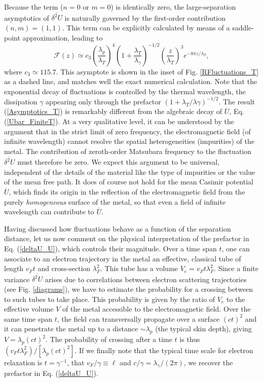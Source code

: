 \documentclass[doublecol]{epl2}
\begin{document}
Because the term ($n=0$ or $m=0$) is identically zero, the large-separation asymptotics of $\overline{\delta^2 U}$ is naturally governed by the first-order contribution $(n,m)=(1,1)$. This term can be explicitly calculated by means of a saddle-point approximation, leading to
\begin{equation}
\mathcal{F}(z)\simeq
c_3
\left(\dfrac{\lambda_p}{\lambda_T}\right)^4\left(1+\frac{\lambda_T}{\lambda_\gamma}\right)^{-1/2}\left(\frac{z}{\lambda_T}\right)^3e^{-8\pi z/\lambda_T},
\label{Asymptotics_T}
\end{equation}
where $c_3\simeq115.7$. This asymptote is shown in the inset of Fig. \ref{RFluctuations_T} as a dashed line, and matches well the exact numerical calculation. Note that the exponential decay of fluctuations is controlled by the thermal wavelength, the dissipation $\gamma$ appearing only  through the prefactor $(1+\lambda_T/\lambda\gamma)^{-1/2}$.
The result (\ref{Asymptotics_T}) is remarkably different from the algebraic decay of $\overline{U}$, Eq. (\ref{Ubar_FiniteT}). At a very qualitative level, it can be understood by the argument that in the strict limit of zero frequency, the electromagnetic field (of infinite wavelength) cannot resolve the spatial heterogeneities (impurities) of the metal. The contribution of zeroth-order Matsubara frequency to the fluctuation $\overline{\delta^2 U}$ must therefore be zero. We expect this argument to be universal, independent of the details of the material like the type of impurities or the value of the mean free path. It does of course not hold for the mean Casimir potential $\overline{U}$, which finds its origin in the reflection of the electromagnetic field from the purely \textit{homogeneous} surface of the metal, so that even a field of infinite wavelength can contribute to $\overline{U}$.



Having discussed how fluctuations behave as a function of the separation distance, let us now comment on the physical interpretation of the prefactor in Eq. (\ref{deltaU_U}), which controls their magnitude. Over a time span $t$, one can associate to an electron  trajectory in the metal an effective, classical tube of length $v_Ft$ and cross-section $\lambda_F^2$. This tube has a volume $V_e=v_F t\lambda_F^2$. Since a finite variance $\overline{\delta^2 U}$ arises due to correlations between electron scattering trajectories (see Fig. \ref{diagrams}), we have to estimate the probability for a crossing between to such tubes to take place. This probability is given by the ratio of $V_e$ to the effective volume $V$ of the metal accessible to the electromagnetic field. Over the same time span $t$, the field can transversally propagate over a surface $(ct)^2$ and it can penetrate the metal up to a distance $\sim\lambda_p$ (the typical skin depth), giving $V=\lambda_p(ct)^2$. 
The probability of crossing after a time $t$ is thus $(v_F t \lambda_F^2)/[\lambda_p(ct)^2 ]$. If we finally note  that the typical time scale for electron relaxation is $t=\gamma^{-1}$, that $v_F/\gamma\equiv\ell$ and $c/\gamma=\lambda_\gamma/(2\pi)$, we recover the prefactor in Eq. (\ref{deltaU_U}).
\end{document}
